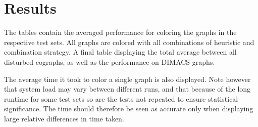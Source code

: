 \documentclass[a4paper]{article}
\begin{document}
\section{Results}
\label{sec:Result}
The tables contain the averaged performance for coloring the graphs in the
respective test sets. All graphs are colored with all combinations of heuristic
and combination strategy. A final table displaying the total average between all
disturbed cographs, as well as the performance on DIMACS graphs.

The average time it took to color a single graph is also displayed. Note
however that system load may vary between different runs, and that because of
the long runtime for some test sets so are the tests not repeated to ensure
statistical significance. The time should therefore be seen as accurate only
when displaying large relative differences in time taken.

\end{document}
